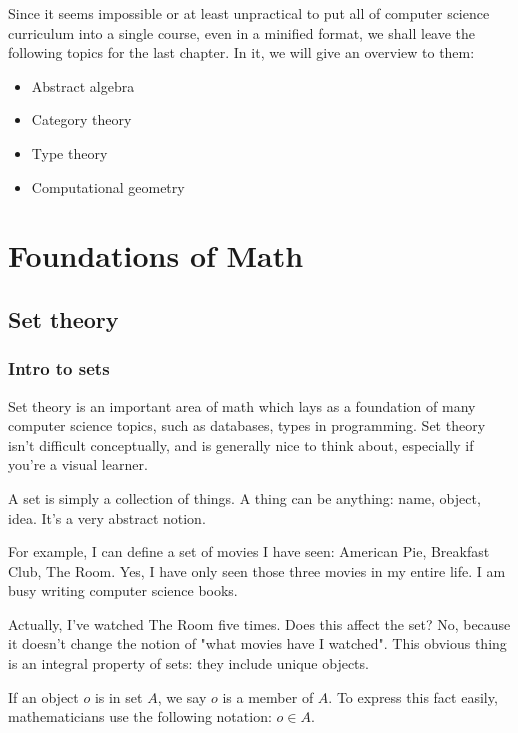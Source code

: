 \documentclass[a4paper, sfsidenotes, justified, notitlepage]{tufte-book-lite}
\begin{document}
Since it seems impossible or at least unpractical to put all of computer science curriculum into a single course, even in a minified format, we shall leave the following topics for the last chapter. In it, we will give an overview to them:

\begin{itemize}
\item Abstract algebra
\item Category theory
\item Type theory
\item Computational geometry
\end{itemize}
\part{Foundations of Math}
\label{sec:orgcf00dc6}
\chapter{Set theory}
\label{sec:org59c5779}

\section{Intro to sets}
\label{sec:org119ed25}

Set theory is an important area of math which lays as a foundation of many computer science topics, such as databases, types in programming. Set theory isn't difficult conceptually, and is generally nice to think about, especially if you're a visual learner.

A set is simply a collection of things. A thing can be anything: name, object, idea. It's a very abstract notion.

For example, I can define a set of movies I have seen: American Pie, Breakfast Club, The Room. Yes, I have only seen those three movies in my entire life. I am busy writing computer science books.

Actually, I've watched The Room five times. Does this affect the set? No, because it doesn't change the notion of "what movies have I watched". This obvious thing is an integral property of sets: they include unique objects.


If an object \(o\) is in set \(A\), we say \(o\) is a member of \(A\). To express this fact easily, mathematicians use the following notation: \(o \in A\).
\end{document}
